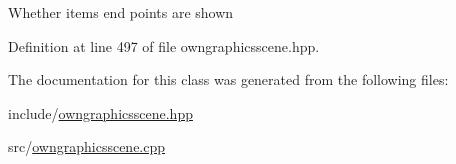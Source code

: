 Whether items end points are shown 

Definition at line 497 of file owngraphicsscene.\+hpp.



The documentation for this class was generated from the following files\+:\begin{DoxyCompactItemize}
\item 
include/\mbox{\hyperlink{owngraphicsscene_8hpp}{owngraphicsscene.\+hpp}}\item 
src/\mbox{\hyperlink{owngraphicsscene_8cpp}{owngraphicsscene.\+cpp}}\end{DoxyCompactItemize}
